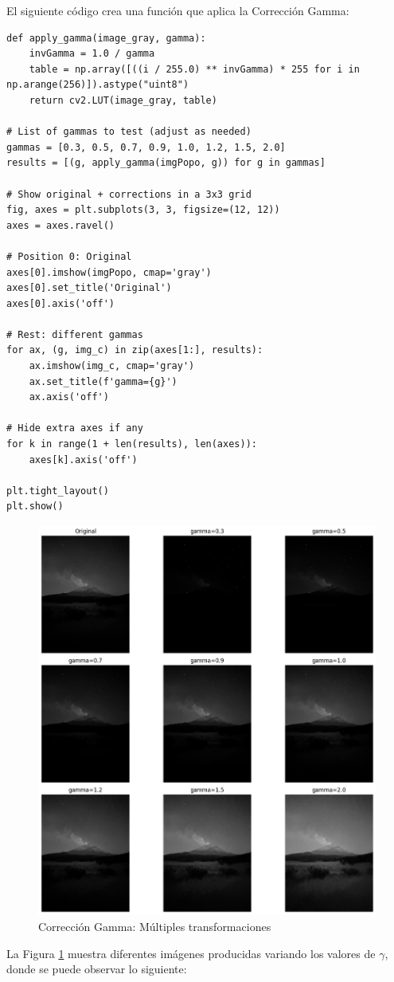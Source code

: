 \documentclass[12pt,letterpaper]{article}
\begin{document}
El siguiente código crea una función que aplica la Corrección Gamma:

\begin{verbatim}
def apply_gamma(image_gray, gamma):
    invGamma = 1.0 / gamma
    table = np.array([((i / 255.0) ** invGamma) * 255 for i in np.arange(256)]).astype("uint8")
    return cv2.LUT(image_gray, table)

# List of gammas to test (adjust as needed)
gammas = [0.3, 0.5, 0.7, 0.9, 1.0, 1.2, 1.5, 2.0]
results = [(g, apply_gamma(imgPopo, g)) for g in gammas]

# Show original + corrections in a 3x3 grid
fig, axes = plt.subplots(3, 3, figsize=(12, 12))
axes = axes.ravel()

# Position 0: Original
axes[0].imshow(imgPopo, cmap='gray')
axes[0].set_title('Original')
axes[0].axis('off')

# Rest: different gammas
for ax, (g, img_c) in zip(axes[1:], results):
    ax.imshow(img_c, cmap='gray')
    ax.set_title(f'gamma={g}')
    ax.axis('off')

# Hide extra axes if any
for k in range(1 + len(results), len(axes)):
    axes[k].axis('off')

plt.tight_layout()
plt.show()
\end{verbatim}


\begin{figure}[H]
  \centering
  \includegraphics[width=0.5\linewidth]{figuras/correccion_gamma.png}
  \caption{Corrección Gamma: Múltiples transformaciones}
  \label{fig:correccion_gamma}
\end{figure}

La Figura \ref{fig:correccion_gamma} muestra diferentes imágenes producidas variando los valores de $\gamma$, donde se puede observar lo siguiente:
\end{document}
